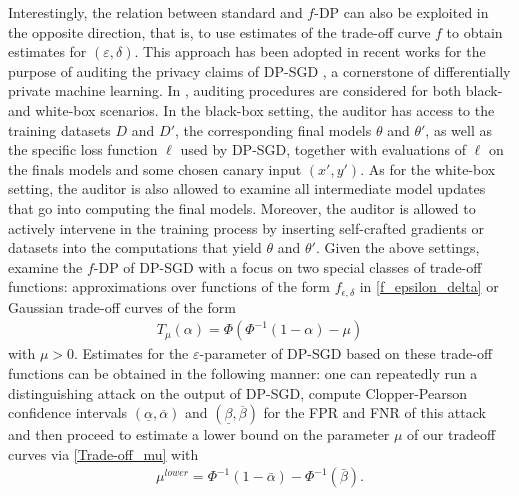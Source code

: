 Interestingly, the relation between standard and $f$-DP can also be exploited in the opposite direction, that is, to use estimates of the trade-off curve $f$ to obtain estimates for $(\varepsilon, \delta)$. This approach has been adopted in recent works for the purpose of auditing the privacy claims of DP-SGD \cite{Nasr2023, Annamalai2024, Annamalai2024_B,Annamalai2024_C,Mahloujifar2024}, a cornerstone of differentially private machine learning. 
In \cite{Nasr2023}, auditing procedures are considered for both black- and white-box scenarios. In the black-box setting, the auditor has access to the training datasets $D$ and $D'$, the corresponding final models $\theta$ and $\theta'$, as well as the specific loss function $\ell$ used by DP-SGD, together with evaluations of $\ell$ on the finals models and some chosen canary input $(x',y')$. As for the white-box setting, the auditor is also allowed to examine all intermediate model updates that go into computing the final models. Moreover, the auditor is allowed to actively intervene in the training process by inserting self-crafted gradients or datasets into the computations that yield $\theta$ and $\theta'$. Given the above settings,~\cite{Nasr2023} examine the $f$-DP of DP-SGD with a focus on two special classes of trade-off functions: approximations over functions of the form $f_{\epsilon,\delta}$ in \eqref{f_epsilon_delta} or Gaussian trade-off curves of the form
\begin{align} \label{Trade-off_mu}
    T_{\mu}(\alpha) = \Phi(\Phi^{-1}(1 - \alpha) - \mu)
\end{align}
with $\mu >0$. Estimates for the $\varepsilon$-parameter of DP-SGD based on these trade-off functions can be obtained in the following manner: one can repeatedly run a distinguishing attack on the output of DP-SGD, compute Clopper-Pearson confidence intervals $(\underline{\alpha},\overline{\alpha})$ and $(\underline{\beta},\overline{\beta})$ for the FPR and FNR of this attack and then proceed to estimate a lower bound on the parameter $\mu$ of our tradeoff curves via \eqref{Trade-off_mu} with
\begin{align*}
    {\mu}^{lower} = \Phi^{-1}(1 - \bar{\alpha}) - \Phi^{-1}( \bar{\beta}).
\end{align*}
